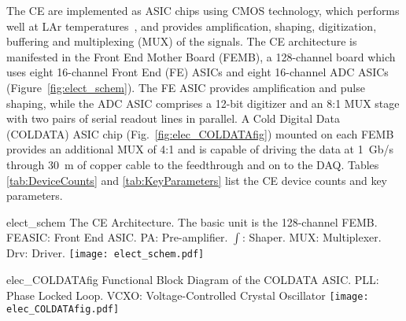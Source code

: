 The CE are implemented as ASIC chips using CMOS technology,
which performs well at LAr temperatures~\cite{ThornEtAl:CELAr},
and provides amplification, shaping, digitization, buffering and multiplexing (MUX) of the signals.
The CE architecture is manifested in the Front End Mother Board (FEMB),
a 128-channel board which uses eight 16-channel Front End (FE) ASICs and eight 16-channel ADC ASICs
(Figure~\ref{fig:elect_schem}).
The FE ASIC provides amplification and pulse shaping, while
the ADC ASIC comprises a 12-bit digitizer
and an 8:1 MUX stage with two pairs of serial readout lines in parallel.
A Cold Digital Data (COLDATA) ASIC chip (Fig.~\ref{fig:elec_COLDATAfig}) mounted on each FEMB provides an additional MUX of 4:1 and
is capable of driving the data at 1~Gb/s through 30~m of copper cable to the feedthrough and on to the DAQ. 
Tables \ref{tab:DeviceCounts} and \ref{tab:KeyParameters} list the CE device counts and key parameters.
\begin{cdrfigure}{elect_schem}
{
  The CE Architecture. The basic unit is the 128-channel FEMB. FEASIC: Front End ASIC.
  PA: Pre-amplifier.  $\int$: Shaper.  MUX: Multiplexer.  Drv: Driver.
}
\texttt{[image: elect\_schem.pdf]}
\end{cdrfigure}
\begin{cdrfigure}{elec_COLDATAfig}
{Functional Block Diagram of the COLDATA ASIC. PLL: Phase Locked Loop.  VCXO: Voltage-Controlled Crystal Oscillator}
\texttt{[image: elec\_COLDATAfig.pdf]}
\end{cdrfigure}


